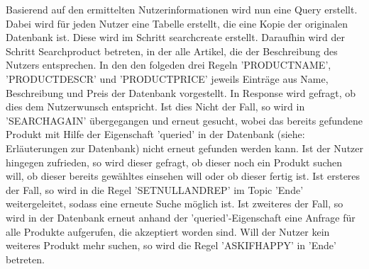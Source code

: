 Basierend auf den ermittelten Nutzerinformationen wird nun eine Query erstellt. Dabei wird für jeden Nutzer eine Tabelle erstellt, die eine Kopie der originalen Datenbank ist. Diese wird im Schritt searchcreate erstellt. Daraufhin wird der Schritt Searchproduct betreten, in der alle Artikel, die der Beschreibung des Nutzers entsprechen. In den den folgeden drei Regeln 'PRODUCTNAME', 'PRODUCTDESCR' und 'PRODUCTPRICE' jeweils Einträge aus Name, Beschreibung und Preis der Datenbank vorgestellt. In Response wird gefragt, ob dies dem Nutzerwunsch entspricht. Ist dies Nicht der Fall, so wird in 'SEARCHAGAIN' übergegangen und erneut gesucht, wobei das bereits gefundene Produkt mit Hilfe der Eigenschaft 'queried' in der Datenbank (siehe: Erläuterungen zur Datenbank) nicht erneut gefunden werden kann. Ist der Nutzer hingegen zufrieden, so wird dieser gefragt, ob dieser noch ein Produkt suchen will, ob dieser bereits gewähltes einsehen will oder ob dieser fertig ist. Ist ersteres der Fall, so wird in die Regel 'SETNULLANDREP' im Topic 'Ende' weitergeleitet, sodass eine erneute Suche möglich ist. Ist zweiteres der Fall, so wird in der Datenbank erneut anhand der 'queried'-Eigenschaft eine Anfrage für alle Produkte aufgerufen, die akzeptiert worden sind. Will der Nutzer kein weiteres Produkt mehr suchen, so wird die Regel 'ASKIFHAPPY' in 'Ende' betreten.  
